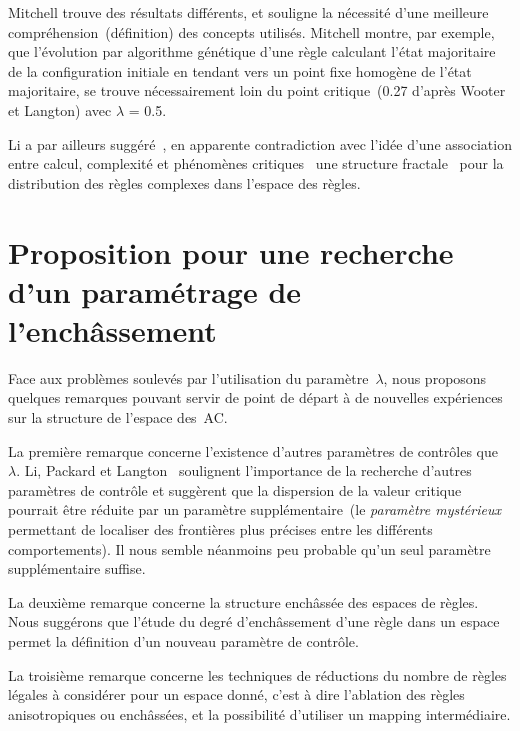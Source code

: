 Mitchell trouve des r\'esultats diff\'erents, et souligne la n\'ecessit\'e
d'une meilleure compr\'ehension~(d\'efinition) des concepts utilis\'es. %
Mitchell montre, par exemple, que l'\'evolution par algorithme g\'en\'etique
d'une r\`egle calculant l'\'etat majoritaire de la configuration initiale
en tendant vers un point fixe homog\`ene de l'\'etat majoritaire, %
se trouve n\'ecessairement loin du point critique~(0.27 d'apr\`es Wooter
et Langton) avec $\lambda$ = 0.5. %

Li a par ailleurs sugg\'er\'e~\cite[]{Li89}, en apparente contradiction
avec l'id\'ee d'une association entre calcul, complexit\'e et ph\'enom\`enes
critiques~\cite[]{Li90b} une structure fractale~\cite[]{Mandelbrot84}
pour la distribution des r\`egles complexes dans l'espace des r\`egles.

\section[Le param\'etrage d'ench\^assement]%
{Proposition pour une recherche d'un param\'etrage de l'ench\^as\-sement}

Face aux probl\`emes soulev\'es par l'utilisation du param\`etre~$\lambda$,
nous proposons quelques remarques pouvant servir de point de d\'epart \`a
de nouvelles exp\'eriences sur la structure de l'espace des~AC.

La premi\`ere remarque concerne l'existence d'autres param\`etres
de contr\^oles que~$\lambda$. %
Li, Packard et Langton~\cite[]{Li90b} soulignent l'importance de la
recherche d'autres param\`etres de contr\^ole et sugg\`erent que la
dispersion de la valeur critique pourrait \^etre r\'eduite par un
param\`etre suppl\'ementaire~(le \emph{param\`etre myst\'erieux} permettant de
localiser des fronti\`eres plus pr\'ecises entre les diff\'erents comportements). %
Il nous semble n\'eanmoins peu probable qu'un seul param\`etre
suppl\'ementaire suffise.

La deuxi\`eme remarque concerne la structure ench\^ass\'ee des espaces de
r\`egles. %
Nous sugg\'erons que l'\'etude du degr\'e d'ench\^assement d'une r\`egle dans un
espace permet la d\'efinition d'un nouveau param\`etre de contr\^ole.

La troisi\`eme remarque concerne les techniques de r\'eductions du nombre
de r\`egles l\'egales \`a consid\'erer pour un espace donn\'e, c'est \`a dire
l'ablation des r\`egles anisotropiques ou ench\^ass\'ees, et la possibilit\'e
d'utiliser un mapping interm\'ediaire.

